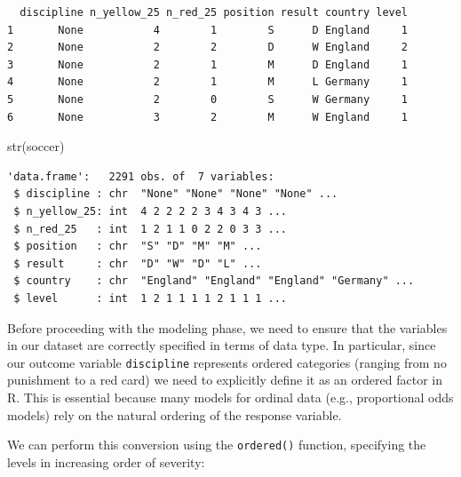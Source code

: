 \documentclass[
  letterpaper,
  DIV=11,
  numbers=noendperiod]{scrartcl}
\newenvironment{Shaded}{\begin{snugshade}}{\end{snugshade}}
\newcommand{\AttributeTok}[1]{\textcolor[rgb]{0.40,0.45,0.13}{#1}}
\newcommand{\CommentTok}[1]{\textcolor[rgb]{0.37,0.37,0.37}{#1}}
\newcommand{\FunctionTok}[1]{\textcolor[rgb]{0.28,0.35,0.67}{#1}}
\newcommand{\NormalTok}[1]{\textcolor[rgb]{0.00,0.23,0.31}{#1}}
\newcommand{\OtherTok}[1]{\textcolor[rgb]{0.00,0.23,0.31}{#1}}
\newcommand{\SpecialCharTok}[1]{\textcolor[rgb]{0.37,0.37,0.37}{#1}}
\newcommand{\StringTok}[1]{\textcolor[rgb]{0.13,0.47,0.30}{#1}}
\begin{document}
\begin{verbatim}
  discipline n_yellow_25 n_red_25 position result country level
1       None           4        1        S      D England     1
2       None           2        2        D      W England     2
3       None           2        1        M      D England     1
4       None           2        1        M      L Germany     1
5       None           2        0        S      W Germany     1
6       None           3        2        M      W England     1
\end{verbatim}

\begin{Shaded}
\begin{Highlighting}[]
\FunctionTok{str}\NormalTok{(soccer)}
\end{Highlighting}
\end{Shaded}

\begin{verbatim}
'data.frame':   2291 obs. of  7 variables:
 $ discipline : chr  "None" "None" "None" "None" ...
 $ n_yellow_25: int  4 2 2 2 2 3 4 3 4 3 ...
 $ n_red_25   : int  1 2 1 1 0 2 2 0 3 3 ...
 $ position   : chr  "S" "D" "M" "M" ...
 $ result     : chr  "D" "W" "D" "L" ...
 $ country    : chr  "England" "England" "England" "Germany" ...
 $ level      : int  1 2 1 1 1 1 2 1 1 1 ...
\end{verbatim}

Before proceeding with the modeling phase, we need to ensure that the
variables in our dataset are correctly specified in terms of data type.
In particular, since our outcome variable \texttt{discipline} represents
ordered categories (ranging from no punishment to a red card) we need to
explicitly define it as an ordered factor in R. This is essential
because many models for ordinal data (e.g., proportional odds models)
rely on the natural ordering of the response variable.

We can perform this conversion using the \texttt{ordered()} function,
specifying the levels in increasing order of severity:

\begin{Shaded}
\end{Shaded}
\end{document}
